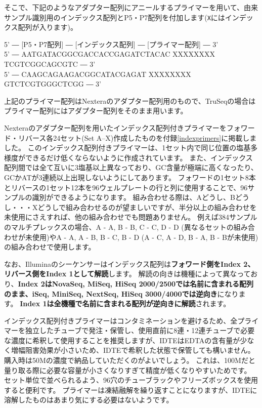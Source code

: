 \documentclass[titlepage,10pt,a4paper,uplatex]{jsbook}
\newenvironment{pre}{\begin{leftbar}\raggedright\ttfamily\footnotesize\setlength{\baselineskip}{1.4em}}{\end{leftbar}\vspace{-1em}}
\renewcommand{\textbf}[1]{{\bfseries\sffamily#1}}
\begin{document}
そこで、下記のようなアダプター配列にアニールするプライマーを用いて、由来サンプル識別用のインデックス配列とP5・P7配列を付加します(\texttt{X}にはインデックス配列が入ります)。

\begin{pre}
5' ― [P5・P7配列] ― [インデックス配列] ― [プライマー配列] ― 3'\\
5' ― AATGATACGGCGACCACCGAGATCTACAC XXXXXXXX TCGTCGGCAGCGTC ― 3'\\
5' ― CAAGCAGAAGACGGCATACGAGAT XXXXXXXX GTCTCGTGGGCTCGG ― 3'
\end{pre}

上記のプライマー配列はNexteraのアダプター配列用のもので、TruSeqの場合はプライマー配列にはアダプター配列をそのまま用います。

Nexteraのアダプター配列を用いたインデックス配列付きプライマーをフォワード・リバース各24セット(Set A--X)作成したものを付録\ref{indexprimers}に掲載しました。
このインデックス配列付きプライマーは、1セット内で同じ位置の塩基多様度ができるだけ低くならないように作成されています。
また、インデックス配列間では全て互いに3塩基以上異なっており、GC含量が極端に高くなったり、GCかATが3連続以上出現しないようにしてあります。
フォワードの1セット8本とリバースの1セット12本を96ウェルプレートの行と列に使用することで、96サンプルの識別ができるようになります。
組み合わせる際は、Aどうし、Bどうし・・・Xどうしで組み合わせるのが望ましいですが、半分以上の組み合わせを未使用にさえすれば、他の組み合わせでも問題ありません。
例えば384サンプルのマルチプレックスの場合、A - A, B - B, C - C, D - D (異なるセットの組み合わせが未使用)やA - A, A - B, B - C, B - D (A - C, A - D, B - A, B - Bが未使用)の組み合わせで使用します。

なお、Illuminaのシーケンサーはインデックス配列は\textbf{フォワード側をIndex 2、リバース側をIndex 1として解読}します。
解読の向きは機種によって異なっており、\textbf{Index 2はNovaSeq, MiSeq, HiSeq 2000/2500では名前に含まれる配列のまま、iSeq, MiniSeq, NextSeq, HiSeq 3000/4000では逆向き}になります。
\textbf{Index 1は全機種で名前に含まれる配列が逆向きに解読}されます。

インデックス配列付きプライマーはコンタミネーションを避けるため、全プライマーを独立したチューブで発注・保管し、使用直前に8連・12連チューブで必要な濃度に希釈して使用することを推奨しますが、IDTEはEDTAの含有量が少なく増幅阻害効果が小さいため、IDTEで希釈した状態で保管しても構いません。
購入時は50{\textmu}Mの濃度で納品していただくのがよいでしょう。
これは、100{\textmu}Mだと量り取る際に必要な容量が小さくなりすぎて精度が低くなりやすいためです。
セット単位で並べられるよう、96穴のチューブラックやフリーズボックスを使用すると便利です。
プライマーは凍結融解を繰り返すことになりますが、IDTEに溶解したものはあまり気にする必要はないようです\citep{Speicher2017}。
\end{document}
